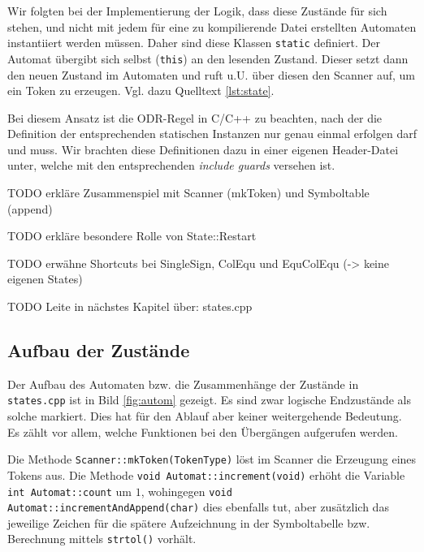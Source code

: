 \documentclass[
a4paper,   %
11pt,      %
oneside,   %
onecolumn, %
final      %
]{article}
\newcommand{\code}[1]{\lstinline$#1$}
\begin{document}
Wir folgten bei der Implementierung der Logik, dass diese Zustände für sich stehen, und nicht mit jedem für eine zu kompilierende Datei erstellten Automaten instantiiert werden müssen.
Daher sind diese Klassen \code{static} definiert. Der Automat übergibt sich selbst (\code{this}) an den lesenden Zustand.
Dieser setzt dann den neuen Zustand im Automaten und ruft u.U. über diesen den Scanner auf, um ein Token zu erzeugen.
Vgl. dazu Quelltext \ref{lst:state}.

Bei diesem Ansatz ist die ODR-Regel in C/C++ zu beachten, nach der die Definition der entsprechenden statischen Instanzen nur genau einmal erfolgen darf und muss.
Wir brachten diese Definitionen dazu in einer eigenen Header-Datei unter, welche mit den entsprechenden \emph{include guards} versehen ist.

TODO erkläre Zusammenspiel mit Scanner (mkToken) und Symboltable (append)

TODO erkläre besondere Rolle von State::Restart

TODO erwähne Shortcuts bei SingleSign, ColEqu und EquColEqu (-> keine eigenen States)

TODO Leite in nächstes Kapitel über: states.cpp

\subsection{Aufbau der Zustände}

Der Aufbau des Automaten bzw. die Zusammenhänge der Zustände in \texttt{states.cpp} ist in Bild \ref{fig:autom} gezeigt. Es sind zwar logische Endzustände als solche markiert. Dies hat für den Ablauf aber keiner weitergehende Bedeutung. Es zählt vor allem, welche Funktionen bei den Übergängen aufgerufen werden.

Die Methode \code{Scanner::mkToken(TokenType)} löst im Scanner die Erzeugung eines Tokens aus. Die Methode \code{void Automat::increment(void)} erhöht die Variable \code{int Automat::count} um $1$, wohingegen \code{void Automat::incrementAndAppend(char)} dies ebenfalls tut, aber zusätzlich das jeweilige Zeichen für die spätere Aufzeichnung in der Symboltabelle bzw. Berechnung mittels \code{strtol()} vorhält.
\end{document}
